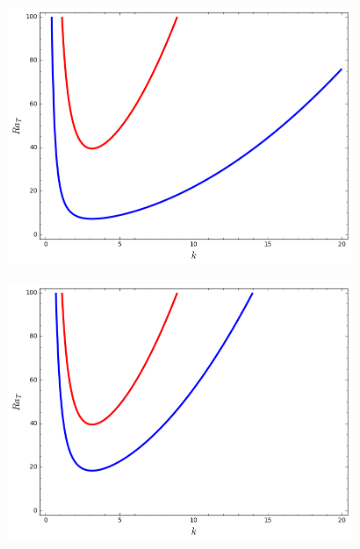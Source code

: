 \documentclass{article}
\begin{document}
\begin{figure}[H]
\centering
\begin{subfigure}{0.49\textwidth}
  \centering
  \includegraphics[scale=0.3]{Figs/energy_stab_Ra_T_vs_k_Ra_S_0_01_tau_0_01.png}
 \subcaption{}
  \label{fig:energy_stab_Ra_T_vs_k_Ra_S_0_01_tau_0_01}
\end{subfigure}%
\begin{subfigure}{.49\textwidth}
  \centering
  \includegraphics[scale=0.3]{Figs/energy_stab_Ra_T_vs_k_Ra_S_0_01_tau_0_1.png}
  \subcaption{}
  \label{fig:energy_stab_Ra_T_vs_k_Ra_S_0_01_tau_0_1}
    \end{subfigure}
    \begin{subfigure}{.49\textwidth}
  \centering

\end{subfigure}
\end{figure}
\end{document}
